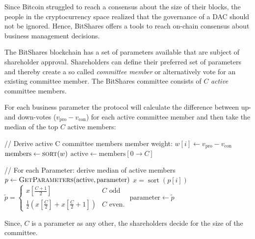 Since Bitcoin struggled to reach a consensus about the size of their blocks,
the people in the cryptocurrency space realized that the governance of a DAC
should not be ignored. Hence, BitShares offers a tools to reach on-chain
consensus about business management decisions.

The BitShares blockchain has a set of parameters available that are subject of
shareholder approval. Shareholders can define their preferred set of parameters
and thereby create a so called \emph{committee member} or alternatively vote
for an existing committee member. The BitShares committee consists of $C$
\emph{active} committee members.

For each business parameter the protocol will calculate the difference between
up- and down-votes ($v_\text{pro}-v_\text{con}$) for each active committee
member and then take the median of the top $C$ active members:
\begin{algorithmic}
 \State // Derive active C committee members
  \State member weight: $w[i] \gets v_\text{pro}-v_\text{con}$
 \EndFor
 \State $\text{members} \gets \Call{sort}{w}$
 \State $\text{active} \gets \text{members}[0 \to C]$

 \State // For each Parameter: derive median of active members
   \State $p \gets \Call{GetParameters}{\text{active}, \text{parameter}}$
   \State $x = \operatorname{sort}(p[i])$
   \State $\tilde p =\begin{cases}
                        x[\frac{C+1}{2}]                                               & C \text{ odd}\\
                        \frac {1}{2}\left(x[{\frac{C}{2}}] + x[\frac{C}{2} + 1]\right) & C \text{ even.}
           \end{cases}$
  \State $\text{parameter} \gets \tilde p$
 \EndFor
\end{algorithmic}
Since, $C$ is a parameter as any other, the shareholders decide for the size of
the committee.

